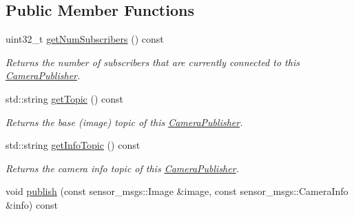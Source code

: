 \subsection*{Public Member Functions}
\begin{DoxyCompactItemize}
\item 
uint32\-\_\-t \hyperlink{classimage__transport_1_1_camera_publisher_a3ab4f35a2549478be6154bb91c6f62e9}{get\-Num\-Subscribers} () const 
\begin{DoxyCompactList}\small\item\em Returns the number of subscribers that are currently connected to this \hyperlink{classimage__transport_1_1_camera_publisher}{Camera\-Publisher}. \end{DoxyCompactList}\item 
\hypertarget{classimage__transport_1_1_camera_publisher_abe9c84e39bb3533e765cd19c9f43607b}{std\-::string \hyperlink{classimage__transport_1_1_camera_publisher_abe9c84e39bb3533e765cd19c9f43607b}{get\-Topic} () const }\label{classimage__transport_1_1_camera_publisher_abe9c84e39bb3533e765cd19c9f43607b}

\begin{DoxyCompactList}\small\item\em Returns the base (image) topic of this \hyperlink{classimage__transport_1_1_camera_publisher}{Camera\-Publisher}. \end{DoxyCompactList}\item 
\hypertarget{classimage__transport_1_1_camera_publisher_a0d99bf10fb26ca65924160d003e71a94}{std\-::string \hyperlink{classimage__transport_1_1_camera_publisher_a0d99bf10fb26ca65924160d003e71a94}{get\-Info\-Topic} () const }\label{classimage__transport_1_1_camera_publisher_a0d99bf10fb26ca65924160d003e71a94}

\begin{DoxyCompactList}\small\item\em Returns the camera info topic of this \hyperlink{classimage__transport_1_1_camera_publisher}{Camera\-Publisher}. \end{DoxyCompactList}\item 
\hypertarget{classimage__transport_1_1_camera_publisher_aaa43f492cde49efe3bfe4192c7ab3c30}{void \hyperlink{classimage__transport_1_1_camera_publisher_aaa43f492cde49efe3bfe4192c7ab3c30}{publish} (const sensor\-\_\-msgs\-::\-Image \&image, const sensor\-\_\-msgs\-::\-Camera\-Info \&info) const }\label{classimage__transport_1_1_camera_publisher_aaa43f492cde49efe3bfe4192c7ab3c30}


\end{DoxyCompactItemize}
